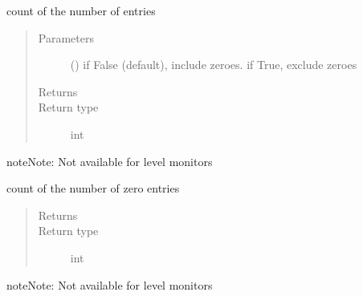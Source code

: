 \documentclass[letterpaper,10pt,english]{sphinxmanual}
\begin{document}
\begin{fulllineitems}
\begin{fulllineitems}
\end{fulllineitems}


\begin{fulllineitems}
\label{\detokenize{Reference:salabim.Monitor.number_of_entries}}
count of the number of entries
\begin{quote}\begin{description}
\item[{Parameters}] \leavevmode
{} () \textendash{} if False (default), include zeroes. if True, exclude zeroes

\item[{Returns}] \leavevmode
{}

\item[{Return type}] \leavevmode
int

\end{description}\end{quote}

\begin{sphinxadmonition}{note}{Note:}
Not available for level monitors
\end{sphinxadmonition}

\end{fulllineitems}


\begin{fulllineitems}
\label{\detokenize{Reference:salabim.Monitor.number_of_entries_zero}}
count of the number of zero entries
\begin{quote}\begin{description}
\item[{Returns}] \leavevmode
{}

\item[{Return type}] \leavevmode
int

\end{description}\end{quote}

\begin{sphinxadmonition}{note}{Note:}
Not available for level monitors
\end{sphinxadmonition}


\end{fulllineitems}
\end{fulllineitems}
\end{document}
